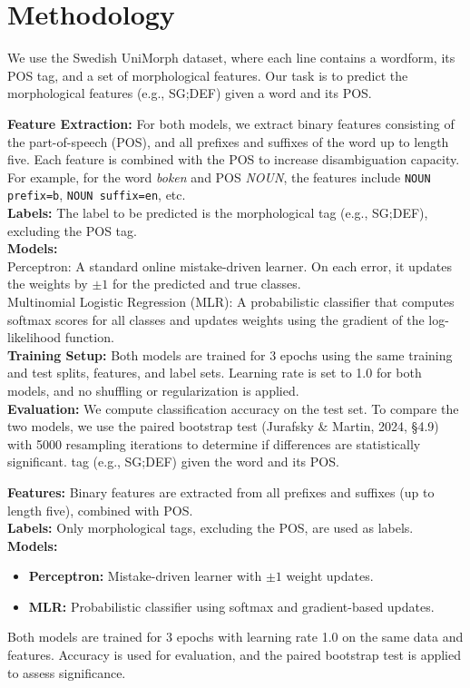 \documentclass[11pt]{article}
\begin{document}
\section{Methodology}
We use the Swedish UniMorph dataset, where each line contains a wordform, its POS tag, and a set of morphological features. Our task is to predict the morphological features (e.g., SG;DEF) given a word and its POS.

\textbf{Feature Extraction:} For both models, we extract binary features consisting of the part-of-speech (POS), and all prefixes and suffixes of the word up to length five. Each feature is combined with the POS to increase disambiguation capacity. For example, for the word \textit{boken} and POS \textit{NOUN}, the features include \texttt{NOUN prefix=b}, \texttt{NOUN suffix=en}, etc.\\
\textbf{Labels:} The label to be predicted is the morphological tag (e.g., SG;DEF), excluding the POS tag.\\
\textbf{Models:} \\Perceptron: A standard online mistake-driven learner. On each error, it updates the weights by \(\pm1\) for the predicted and true classes.\\Multinomial Logistic Regression (MLR): A probabilistic classifier that computes softmax scores for all classes and updates weights using the gradient of the log-likelihood function.\\
\textbf{Training Setup:} Both models are trained for 3 epochs using the same training and test splits, features, and label sets. Learning rate is set to 1.0 for both models, and no shuffling or regularization is applied.\\
\textbf{Evaluation:} We compute classification accuracy on the test set. To compare the two models, we use the paired bootstrap test (Jurafsky \& Martin, 2024, \S4.9) with 5000 resampling iterations to determine if differences are statistically significant.
 tag (e.g., SG;DEF) given the word and its POS.

\textbf{Features:} Binary features are extracted from all prefixes and suffixes (up to length five), combined with POS. \\
\textbf{Labels:} Only morphological tags, excluding the POS, are used as labels. \\
\textbf{Models:}
\begin{itemize}
  \item \textbf{Perceptron:} Mistake-driven learner with \(\pm1\) weight updates.
  \item \textbf{MLR:} Probabilistic classifier using softmax and gradient-based updates.
\end{itemize}
Both models are trained for 3 epochs with learning rate 1.0 on the same data and features. Accuracy is used for evaluation, and the paired bootstrap test is applied to assess significance.
\end{document}
